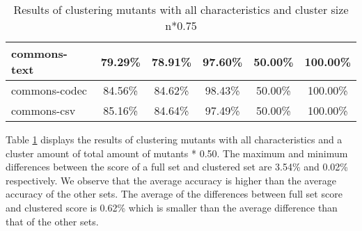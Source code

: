 \documentclass[../main]{subfiles}
\begin{document}
\begin{table}[htb]
\begin{tabular}{|l|c|c|c|c|c|}
commons-text                  & 79.29\%                                                                                 & 78.91\%                                                                                     & 97.60\%                                                                              & 50.00\%                                                                               & 100.00\%                                                                             \\ \hline
commons-codec                 & 84.56\%                                                                                 & 84.62\%                                                                                     & 98.43\%                                                                              & 50.00\%                                                                               & 100.00\%                                                                             \\ \hline
commons-csv                   & 85.16\%                                                                                 & 84.64\%                                                                                     & 97.49\%                                                                              & 50.00\%                                                                               & 100.00\%                                                                             \\ \hline

\end{tabular}
\caption{\label{tab:clustering_all_75}Results of clustering mutants with all characteristics and cluster size n*0.75}
\end{table}
\FloatBarrier

Table \ref{tab:clustering_all_75} displays the results of clustering mutants with all characteristics and a cluster amount of total amount of mutants * 0.50.
The maximum and minimum differences between the score of a full set and clustered set are 3.54\% and 0.02\% respectively.
We observe that the average accuracy is higher than the average accuracy of the other sets.
The average of the differences between full set score and clustered score is  0.62\% which is smaller than the average difference than that of the other sets.
\end{document}
